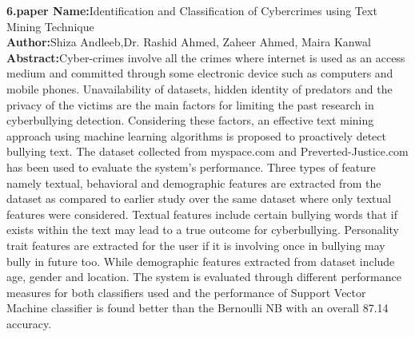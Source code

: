 \documentclass[oneside,a4paper,12pt]{report}
\begin{document}
\item \textbf{6.paper Name:}Identification and Classification of Cybercrimes using
Text Mining Technique\\
\textbf{Author:}Shiza Andleeb,Dr. Rashid Ahmed, Zaheer Ahmed, Maira Kanwal\\
\textbf{Abstract:}Cyber-crimes involve all the crimes where internet
is used as an access medium and committed through some
electronic device such as computers and mobile phones.
Unavailability of datasets, hidden identity of predators and the
privacy of the victims are the main factors for limiting the past
research in cyberbullying detection. Considering these factors, an
effective text mining approach using machine learning
algorithms is proposed to proactively detect bullying text. The
dataset collected from myspace.com and Preverted-Justice.com
has been used to evaluate the system’s performance. Three types
of feature namely textual, behavioral and demographic features
are extracted from the dataset as compared to earlier study over
the same dataset where only textual features were considered.
Textual features include certain bullying words that if exists
within the text may lead to a true outcome for cyberbullying.
Personality trait features are extracted for the user if it is
involving once in bullying may bully in future too. While
demographic features extracted from dataset include age, gender
and location. The system is evaluated through different
performance measures for both classifiers used and the
performance of Support Vector Machine classifier is found better
than the Bernoulli NB with an overall 87.14%
accuracy.\\
\end{document}
